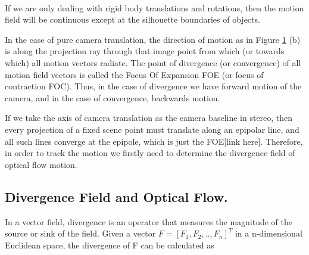 \documentclass[12pt,fleqn]{book} %
\begin{document}
\begin{figure}[h]
\begin{dBox}
\centering
  \mbox{
   }
   \caption{\label{fig:dynamic12} }   
\end{dBox}   
\end{figure}

If we are only dealing with rigid body translations and rotations, then the motion field will be continuous except at the silhouette boundaries of objects.\bigskip

In the case of pure camera translation, the direction of motion as in Figure \ref{fig:dynamic12} (b) is along the projection ray through that image point from which (or towards which) all motion vectors radiate. The point of divergence (or convergence) of all motion field vectors is called the Focus Of Expansion FOE (or focus of contraction FOC). Thus, in the case of divergence we have forward motion of the camera, and in the case of convergence, backwards motion.\bigskip

If we take the axis of camera translation as the camera baseline in stereo, then every projection of a fixed scene point must translate along an epipolar line, and all such lines converge at the epipole, which is just the FOE[link here].  Therefore, in order to track the motion we firstly need to determine the divergence field of optical flow motion.\bigskip


\subsection{Divergence Field and Optical Flow.}
In a vector field, divergence is an operator that measures the magnitude of the source or sink of the field. Given a vector $F=[F_1,F_2,..,F_n]^T$ in a n-dimensional Euclidean space, the divergence of F can be calculated as \bigskip
\end{document}

